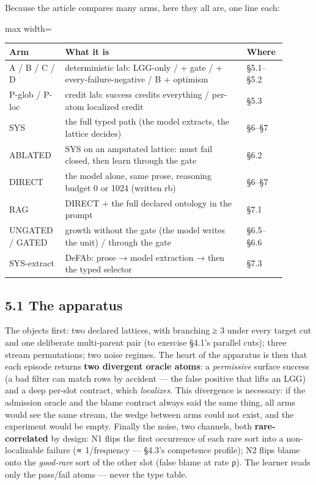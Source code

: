 \documentclass[11pt]{article}
\begin{document}
Because the article compares many arms, here they all are, one line each:

\begin{center}\small\begin{adjustbox}{max width=\linewidth}\begin{tabular}{>{\raggedright\arraybackslash}p{0.174\linewidth}>{\raggedright\arraybackslash}p{0.615\linewidth}>{\raggedright\arraybackslash}p{0.113\linewidth}}\toprule
Arm & What it is & Where \\ \midrule
A / B / C / D & deterministic lab: LGG-only / + gate / + every-failure-negative / B + optimism & §5.1–§5.2 \\
P-glob / P-loc & credit lab: success credits everything / per-atom localized credit & §5.3 \\
SYS & the full typed path (the model extracts, the lattice decides) & §6–§7 \\
ABLATED & SYS on an amputated lattice: must fail closed, then learn through the gate & §6.2 \\
DIRECT & the model alone, same prose, reasoning budget 0 or 1024 (written rb) & §6–§7 \\
RAG & DIRECT + the full declared ontology in the prompt & §7.1 \\
UNGATED / GATED & growth without the gate (the model writes the unit) / through the gate & §6.5–§6.6 \\
SYS-extract & DeFAb: prose → model extraction → then the typed selector & §7.3 \\
\bottomrule\end{tabular}\end{adjustbox}\end{center}

\subsection*{5.1 The apparatus}

The objects first: two declared lattices, with branching ≥ 3 under every target cut and one deliberate multi-parent pair (to exercise §4.1's parallel cuts); three stream permutations; two noise regimes. The heart of the apparatus is then that each episode returns \textbf{two divergent oracle atoms}: a \emph{permissive} surface success (a bad filter can match rows by accident — the false positive that lifts an LGG) and a deep per-slot contract, which \emph{localizes}. This divergence is necessary: if the admission oracle and the blame contract always said the same thing, all arms would see the same stream, the wedge between arms could not exist, and the experiment would be empty. Finally the noise, two channels, both \textbf{rare-correlated} by design: N1 flips the first occurrence of each rare sort into a non-localizable failure (∝ 1/frequency — §4.3's competence profile); N2 flips blame onto the \emph{good-rare} sort of the other slot (false blame at rate ρ). The learner reads only the pass/fail atoms — never the type table.
\end{document}
